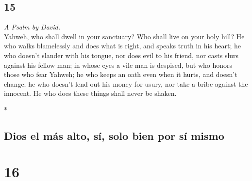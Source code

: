 \begin{paracol}{2}
\switchcolumn
\begin{otherlanguage}{english}

\hypertarget{section-29}{%
\section{15}\label{section-29}}

\emph{A Psalm by David.}\\
 Yahweh, who shall dwell in your sanctuary? Who shall live
on your holy hill?  He who walks blamelessly and does what
is right, and speaks truth in his heart;  he who doesn't
slander with his tongue, nor does evil to his friend, nor casts slurs
against his fellow man;  in whose eyes a vile man is
despised, but who honors those who fear Yahweh; he who keeps an oath
even when it hurts, and doesn't change;  he who doesn't
lend out his money for usury, nor take a bribe against the innocent. He
who does these things shall never be shaken.

\end{otherlanguage}

\switchcolumn[0]*

\hypertarget{dios-el-muxe1s-alto-suxed-solo-bien-por-suxed-mismo}{%
\subsection{Dios el más alto, sí, solo bien por sí
mismo}\label{dios-el-muxe1s-alto-suxed-solo-bien-por-suxed-mismo}}

\hypertarget{section-30}{%
\section{16}\label{section-30}}


\end{paracol}
